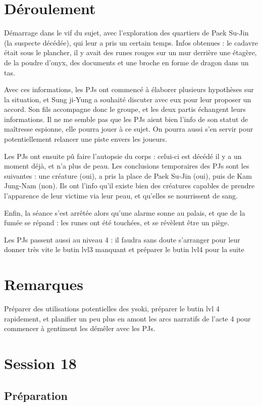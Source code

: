 \documentclass[10pt,a4paper]{book}
\begin{document}
\section{Déroulement}
Démarrage dans le vif du sujet, avec l'exploration des quartiers de Paek Su-Jin (la suspecte décédée), qui leur a pris un certain temps.
Infos obtenues : le cadavre était sous le plancher, il y avait des runes rouges sur un mur derrière une étagère, de la poudre d'onyx, des documents et une broche en forme de dragon dans un tas. 

Avec ces informations, les PJs ont commencé à élaborer plusieurs hypothèses sur la situation, et Sung ji-Yung a souhaité discuter avec eux pour leur proposer un accord. Son fils accompagne donc le groupe, et les deux partis échangent leurs informations. Il ne me semble pas que les PJs aient bien l'info de son statut de maîtresse espionne, elle pourra jouer à ce sujet. On pourra aussi s'en servir pour potentiellement relancer une piste envers les joueurs.

Les PJs ont ensuite pû faire l'autopsie du corps : celui-ci est décédé il y a un moment déjà, et n'a plus de peau. Les conclusions temporaires des PJs sont les suivantes : une créature (oui), a pris la place de Paek Su-Jin (oui), puis de Kam Jung-Nam (non). Ils ont l'info qu'il existe bien des créatures capables de prendre l'apparence de leur victime via leur peau, et qu'elles se nourrissent de sang.

Enfin, la séance s'est arrêtée alors qu'une alarme sonne au palais, et que de la fumée se répand : les runes ont été touchées, et se révèlent être un piège.

Les PJs passent aussi au niveau 4 : il faudra sans doute s'arranger pour leur donner très vite le butin lvl3 manquant et préparer le butin lvl4 pour la suite
\section{Remarques}
Préparer des utilisations potentielles des ysoki, préparer le butin lvl 4 rapidement, et planifier un peu plus en amont les arcs narratifs de l'acte 4 pour commencer à gentiment les démêler avec les PJs.


\section{Session 18}
\subsection{Préparation}
\end{document}

